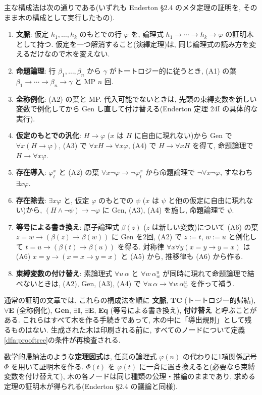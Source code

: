 主な構成法は次の通りである(いずれも Enderton \S 2.4 のメタ定理の証明を, そのまま木の構成として実行したもの).
\begin{enumerate}[label=(\arabic*)]
  \item \textbf{文脈}: 仮定 $h_1, \ldots, h_k$ のもとでの行 $\varphi$ を, 論理式 $h_1 \to \cdots \to h_k \to \varphi$ の証明木として持つ. 仮定を一つ解消すること(演繹定理)は, 同じ論理式の読み方を変えるだけなので木を変えない.
  \item \textbf{命題論理}: 行 $\beta_1, \ldots, \beta_n$ から $\gamma$ がトートロジー的に従うとき, (A1) の葉 $\beta_1 \to \cdots \to \beta_n \to \gamma$ と MP $n$ 回.
  \item \textbf{全称例化}: (A2) の葉と MP. 代入可能でないときは, 先頭の束縛変数を新しい変数で例化してから Gen し直して付け替える(Enderton 定理 24I の具体的な実行).
  \item \textbf{仮定のもとでの汎化}: $H \to \varphi$ ($x$ は $H$ に自由に現れない)から Gen で $\forall x(H \to \varphi)$, (A3) で $\forall x H \to \forall x\varphi$, (A4) で $H \to \forall x H$ を得て, 命題論理で $H \to \forall x\varphi$.
  \item \textbf{存在導入}: $\varphi^x_t$ と (A2) の葉 $\forall x\neg\varphi \to \neg\varphi^x_t$ から命題論理で $\neg\forall x\neg\varphi$, すなわち $\exists x\varphi$.
  \item \textbf{存在除去}: $\exists x\varphi$ と, 仮定 $\varphi$ のもとでの $\psi$ ($x$ は $\psi$ と他の仮定に自由に現れない)から, $(H \land \neg\psi) \to \neg\varphi$ に Gen, (A3), (A4) を施し, 命題論理で $\psi$.
  \item \textbf{等号による書き換え}: 原子論理式 $\beta(z)$ ($z$ は新しい変数)について (A6) の葉 $z = w \to (\beta(z) \to \beta(w))$ に Gen を2回, (A2) で $z := t$, $w := u$ と例化して $t = u \to (\beta(t) \to \beta(u))$ を得る. 対称律 $\forall x \forall y(x = y \to y = x)$ は (A6) $x = y \to (x = x \to y = x)$ と (A5) から, 推移律も (A6) から作る.
  \item \textbf{束縛変数の付け替え}: 素論理式 $\forall u\,\alpha$ と $\forall w\,\alpha^u_w$ が同時に現れて命題論理で結べないときは, (A2), Gen, (A3), (A4) で $\forall u\,\alpha \to \forall w\,\alpha^u_w$ を作って補う.
\end{enumerate}

通常の証明の文章では, これらの構成法を順に \textbf{文脈}, \textbf{TC} (トートロジー的帰結), \textbf{$\forall$E} (全称例化), \textbf{Gen}, \textbf{$\exists$I}, \textbf{$\exists$E}, \textbf{Eq} (等号による書き換え), \textbf{付け替え} と呼ぶことがある. これらはすべて木を作る手続きであって, 木の中に「導出規則」として残るものはない. 生成された木は印刷される前に, すべてのノードについて定義\ref{dfn:prooftree}の条件が再検査される.

\begin{rem}[図式]
  数学的帰納法のような\textbf{定理図式}は, 任意の論理式 $\varphi(n)$ の代わりに1項関係記号 $\Phi$ を用いて証明木を作る. $\Phi(t)$ を $\varphi(t)$ に一斉に置き換えると(必要なら束縛変数を付け替えて), 木の各ノードは同じ種類の公理・推論のままであり, 求める定理の証明木が得られる(Enderton \S 2.4 の議論と同様).
\end{rem}
